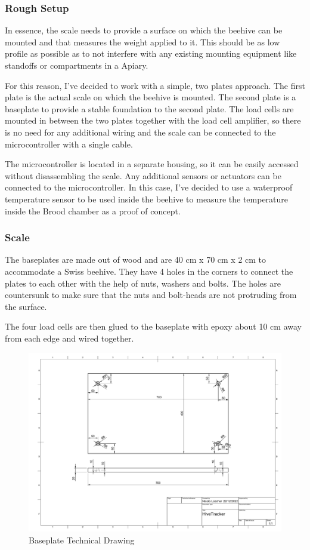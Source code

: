 \subsubsection{Rough Setup}
In essence, the scale needs to provide a surface on which the beehive can be mounted and that measures the weight applied to it. This should be as low profile as possible as to not interfere with any existing mounting equipment like standoffs or compartments in a \gls{Apiary}.

For this reason, I've decided to work with a simple, two plates approach. The first plate is the actual scale on which the beehive is mounted. The second plate is a baseplate to provide a stable foundation to the second plate. The load cells are mounted in between the two plates together with the load cell \gls{amplifier}, so there is no need for any additional wiring and the scale can be connected to the microcontroller with a single cable.

The microcontroller is located in a separate housing, so it can be easily accessed without disassembling the scale. Any additional sensors or actuators can be connected to the microcontroller. In this case, I've decided to use a waterproof temperature sensor to be used inside the beehive to measure the temperature inside the \gls{Brood chamber} as a proof of concept.

\subsubsection{Scale}
The baseplates are made out of wood and are 40 cm x 70 cm x 2 cm to accommodate a Swiss beehive. They have 4 holes in the corners to connect the plates to each other with the help of nuts, washers and bolts. The holes are countersunk to make sure that the nuts and bolt-heads are not protruding from the surface.

The four load cells are then glued to the baseplate with epoxy about 10 cm away from each edge and wired together.

\begin{figure}
    \centering
    \includegraphics[angle=90,width=1\textwidth]{figures/hivetracker_baseplate.pdf}
    \caption{Baseplate Technical Drawing}
    \label{fig:baseplate_drawing}
\end{figure}
\newpage

